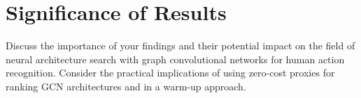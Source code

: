 \section{Significance of Results}

Discuss the importance of your findings and their potential impact on the field of neural architecture search with graph convolutional networks for human action recognition. Consider the practical implications of using zero-cost proxies for ranking GCN architectures and in a warm-up approach.

\begin{comment}
\subsection{RQ1:}

Har lagt til dette i første kap om RQ 1. 
\end{comment}
\begin{comment}
\subsection{RQ2:}
The findings from this study carry significant implications for the field of NAS, particularly in terms of performance estimation and computational efficiency working with GCN. By identifying the optimal warm-up points for different zero-cost proxies, we can potentially halt the training process much earlier than traditionally done, without sacrificing the accuracy and reliability of performance estimation.

This early stopping of training can lead to substantial reductions in computational workload and search costs, making the NAS process more efficient and accessible to a wider range of researchers and practitioners. Additionally, the improved performance prediction facilitated by the warm-up phase enables more effective exploration of the search space in NAS, leading to the discovery of better architectures. 

Notably, the reduced computational demands also result lessening the environmental impact. By decreasing the training time and computational resources required for NAS, we can significantly lower the energy consumption and the associated carbon footprint of the process. This aligns with the growing global concern for sustainable practices in artificial intelligence research and development.

In conclusion, the results of this study provide a solid foundation for further research into the application of warm-up with zero-cost proxies in NAS. Future studies could investigate the generalizability of these findings across different datasets and tasks or explore ways to combine multiple zero-cost proxies for even more accurate and reliable performance estimation.

\end{comment}
